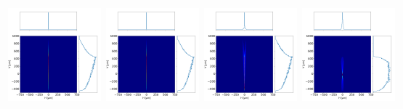 \documentclass[a4paper, 11pt]{article}
\begin{document}
\begin{figure}
\centering
\includegraphics[width=0.22\textwidth]{figures/p2s_V.png}
\includegraphics[width=0.22\textwidth]{figures/p2s_K.png}
\includegraphics[width=0.22\textwidth]{figures/p2s_parabolic-cone.png}
\includegraphics[width=0.22\textwidth]{figures/p2s_toroid.png}


\end{figure}
\end{document}
